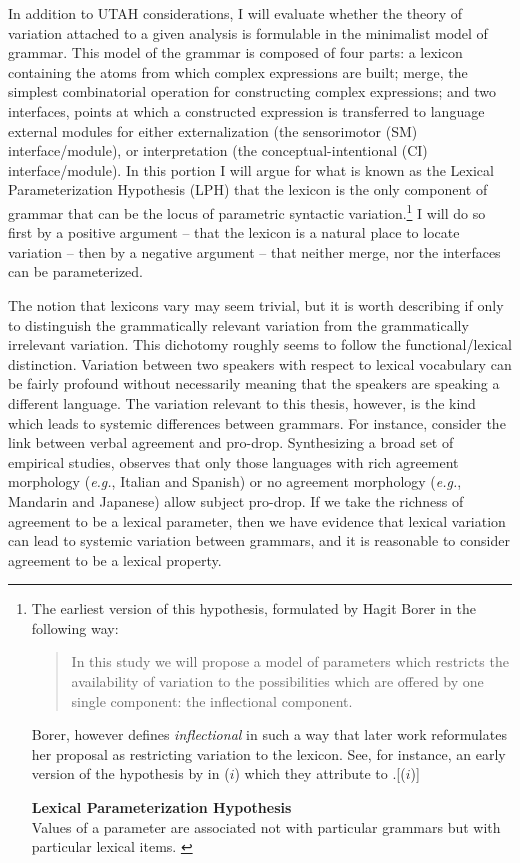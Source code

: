 \documentclass[MilwayThesis]{subfiles}
\begin{document}
In addition to UTAH considerations, I will evaluate whether the theory of variation attached to a given analysis is formulable in the minimalist model of grammar.
This model of the grammar is composed of four parts:
	a lexicon containing the atoms from which complex expressions are built;
	merge, the simplest combinatorial operation for constructing complex expressions; 
	and two interfaces, points at which a constructed expression is transferred to language external modules for either externalization (the sensorimotor (SM) interface/module), or interpretation (the conceptual-intentional (CI) interface/module).
In this portion I will argue for what is known as the Lexical Parameterization Hypothesis (LPH) that the lexicon is the only component of grammar that can be the locus of parametric syntactic variation.\footnote{ 
	The earliest version of this hypothesis, formulated by Hagit Borer in the following way:
	\begin{quote}
		In this study we will propose a model of parameters which restricts the availability of variation to the possibilities which are offered by one single component: the inflectional component. \parencite[3]{borer1984parametric}
	\end{quote}
	Borer, however defines \textit{inflectional} in such a way that later work reformulates her proposal as restricting variation to the lexicon.
	See, for instance, an early version of the hypothesis by \textcite{manzini1987parameters} in ($i$) which they attribute to \textcite{borer1984parametric}
	\ex.[($i$)]
	\begin{minipage}[t]{\textwidth - 4em}
		\textbf{Lexical Parameterization Hypothesis}\\
		Values of a parameter are associated not with particular grammars but with particular lexical items. \parencite[424]{manzini1987parameters}
	\end{minipage}

} 
I will do so first by a positive argument -- that the lexicon is a natural place to locate variation -- then by a negative argument -- that neither merge, nor the interfaces can be parameterized.

The notion that lexicons vary may seem trivial, but it is worth describing if only to distinguish the grammatically relevant variation from the grammatically irrelevant variation.
This dichotomy roughly seems to follow the functional/lexical distinction.
Variation between two speakers with respect to lexical vocabulary can be fairly profound without necessarily meaning that the speakers are speaking a different language.
The variation relevant to this thesis, however, is the kind which leads to systemic differences between grammars.
For instance, consider the link between verbal agreement and pro-drop.
Synthesizing a broad set of empirical studies, \textcite{huang1984distribution} observes that only those languages with rich agreement morphology (\textit{e.g.}, Italian and Spanish) or no agreement morphology (\textit{e.g.}, Mandarin and Japanese) allow subject pro-drop.
If we take the richness of agreement to be a lexical parameter, then we have evidence that lexical variation can lead to systemic variation between grammars, and it is reasonable to consider agreement to be a lexical property.
\end{document}
